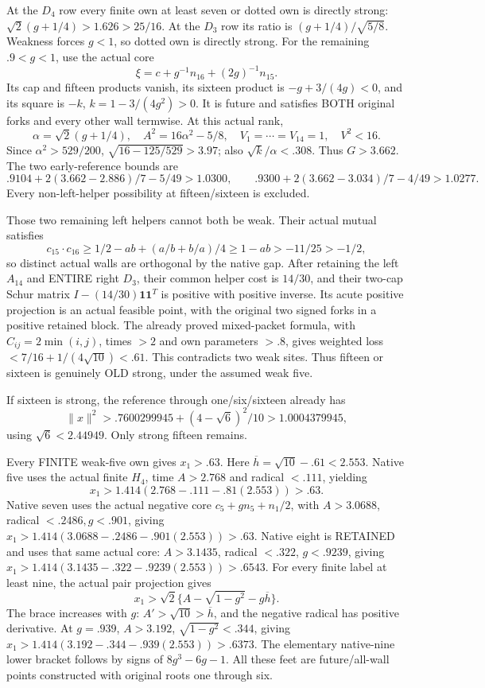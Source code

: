 \documentclass[11pt]{article}
\theoremstyle{definition}
\theoremstyle{remark}
\begin{document}
At the \(D_4\) row every finite
own at least seven or dotted
own is directly strong:
\(\sqrt2(g+1/4)>1.626>25/16\).
At the \(D_3\) row its ratio is
\((g+1/4)/\sqrt{5/8}\).
Weakness forces \(g<1\), so
dotted own is directly strong.
For the remaining \(.9<g<1\),
use the actual core
\[
                          \xi=c+g^{-1}n_{16}+(2g)^{-1}n_{15}.
\]
Its cap and fifteen products
vanish, its sixteen product is
\(-g+3/(4g)<0\), and its square
is \(-k\), \(k=1-3/(4g^2)>0\).
It is future and satisfies BOTH
original forks and every other
wall termwise.
At this actual rank,
\[
 \alpha=\sqrt2(g+1/4),\quad A^2=16\alpha^2-5/8,\quad
          V_1=\cdots=V_{14}=1,\quad V^2<16 .
\]
Since \(\alpha^2>529/200\),
\(\sqrt{16-125/529}>3.97\);
also \(\sqrt k/\alpha<.308\).
Thus \(G>3.662\).
The two early-reference bounds are
\[
 .9104+2(3.662-2.886)/7-5/49>1.0300,\qquad
 .9300+2(3.662-3.034)/7-4/49>1.0277 .
\]
Every non-left-helper possibility
at fifteen/sixteen is excluded.

Those two remaining left helpers
cannot both be weak.
Their actual mutual satisfies
\[
 c_{15}\cdot c_{16}\ge
 1/2-ab+(a/b+b/a)/4\ge1-ab>-11/25>-1/2 ,
\]
so distinct actual walls are
orthogonal by the native gap.
After retaining the left
\(A_{14}\) and ENTIRE right
\(D_3\), their common helper
cost is \(14/30\), and their
two-cap Schur matrix
\(I-(14/30)\mathbf1\mathbf1^T\)
is positive with positive inverse.
Its acute positive projection
is an actual feasible point,
with the original two signed
forks in a positive retained
block.
The already proved mixed-packet
formula, with \(C_{ij}=2\min(i,j)\),
times \(>2\) and own parameters
\(>.8\), gives weighted loss
\(<7/16+1/(4\sqrt{10})<.61\).
This contradicts two weak sites.
Thus fifteen or sixteen is
genuinely OLD strong, under the
assumed weak five.

If sixteen is strong, the
reference through one/six/sixteen
already has
\[
 \|x\|^2>.7600299945+(4-\sqrt6)^2/10
                >1.0004379945 ,
\]
using \(\sqrt6<2.44949\).
Only strong fifteen remains.

Every FINITE weak-five own gives
\(x_1>.63\).
Here \(\overline h=\sqrt{10}-.61<2.553\).
Native five uses the actual finite
\(H_4\), time \(A>2.768\) and
radical \(<.111\), yielding
\[
                     x_1>1.414(2.768-.111-.81(2.553))>.63 .
\]
Native seven uses the actual
negative core \(c_5+g n_5+n_1/2\),
with \(A>3.0688\), radical
\(<.2486,g<.901\), giving
\(x_1>1.414(3.0688-.2486-.901(2.553))>.63\).
Native eight is RETAINED and
uses that same actual core:
\(A>3.1435\), radical \(<.322\),
\(g<.9239\), giving
\(x_1>1.414(3.1435-.322-.9239(2.553))>.6543\).
For every finite label at least
nine, the actual pair projection
gives
\[
                   x_1>\sqrt2\{A-\sqrt{1-g^2}-g\overline h\}.
\]
The brace increases with \(g\):
\(A'>\sqrt{10}>\overline h\),
and the negative radical has
positive derivative.
At \(g=.939\), \(A>3.192\),
\(\sqrt{1-g^2}<.344\), giving
\(x_1>1.414(3.192-.344-.939(2.553))>.6373\).
The elementary native-nine lower
bracket follows by signs of
\(8g^3-6g-1\).
All these feet are future/all-wall
points constructed with original
roots one through six.
\end{document}

